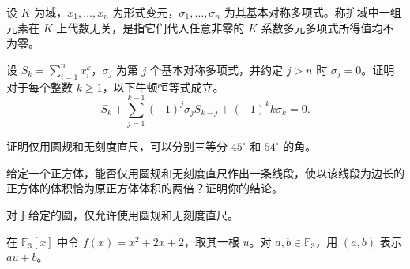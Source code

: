 \noindent\begin{minipage}{\textwidth}
设 $K$ 为域，$x_1,\ldots,x_n$ 为形式变元，$\sigma_1,\ldots,\sigma_n$ 为其基本对称多项式。称扩域中一组元素在 $K$ 上代数无关，是指它们代入任意非零的 $K$ 系数多元多项式所得值均不为零。
\end{minipage}\par\vfill
\newpage
\noindent\begin{minipage}{\textwidth}
设 $S_k=\sum_{i=1}^n x_i^k$，$\sigma_j$ 为第 $j$ 个基本对称多项式，并约定 $j>n$ 时 $\sigma_j=0$。证明对于每个整数 $k\ge1$，以下牛顿恒等式成立。
\[
S_k+\sum_{j=1}^{k-1}(-1)^j\sigma_j S_{k-j}+(-1)^k k\sigma_k=0.
\]
\end{minipage}\par\vfill
\noindent\begin{minipage}{\textwidth}
证明仅用圆规和无刻度直尺，可以分别三等分 $45^\circ$ 和 $54^\circ$ 的角。
\end{minipage}\par\vfill
\noindent\begin{minipage}{\textwidth}
给定一个正方体，能否仅用圆规和无刻度直尺作出一条线段，使以该线段为边长的正方体的体积恰为原正方体体积的两倍？证明你的结论。
\end{minipage}\par\vfill
\newpage
\noindent\begin{minipage}{\textwidth}
对于给定的圆，仅允许使用圆规和无刻度直尺。
\end{minipage}\par\vfill
\noindent\begin{minipage}{\textwidth}
在 $\mathbb{F}_3[x]$ 中令 $f(x)=x^2+2x+2$，取其一根 $u$。对 $a,b\in\mathbb{F}_3$，用 $(a,b)$ 表示 $au+b$。
\end{minipage}\par\vfill
